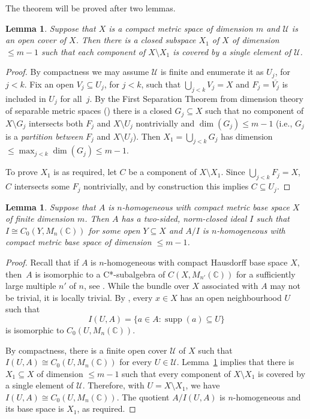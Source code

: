 \documentclass[11pt]{amsproc}
\newcommand{\cstar}{C*}
\newcommand{\bbC}{\mathbb C}
\newcommand{\cU}{\mathcal U}
\DeclareMathOperator{\supp}{supp}
\theoremstyle{definition}
\theoremstyle{plain}
\newtheorem{lemma}[definition]{Lemma}
\theoremstyle{remark}
\begin{document}
The theorem will be proved after two lemmas. 

\begin{lemma}\label{L.Dimension}
	Suppose that $X$ is a compact metric space of dimension $m$ and $\cU$ is an open cover of $X$. Then there is a closed subspace $X_1$ of $X$ of dimension $\leq m-1$ such that each component of $X\setminus X_1$ is covered by a single element of $\cU$. 
\end{lemma}

\begin{proof}
	By compactness we may assume $\cU$ is finite and enumerate it as $U_j$, for~$j<k$. Fix an open $V_j\subseteq U_j$, for $j<k$, such that $\bigcup_{j<k} V_j=X$ and $F_j=\overline {V_j}$ is included in $U_j$ for all~$j$. By the First Separation Theorem  from dimension theory of separable metric spaces (\cite[Theorem~1.5.12]{engelking1978dimension}) there is a closed $G_j\subseteq X$ such that no component of $X\setminus G_j$ intersects both  $F_j$ and $X\setminus U_j$ nontrivially and $\dim(G_j)\leq m-1$ (i.e., $G_j$ is a \emph{partition between} $F_j$ and $X\setminus U_j$). 
	Then $X_1=\bigcup_{j<k} G_j$ has dimension $\leq \max_{j<k} \dim(G_j)\leq m-1$. 
	
	To prove $X_1$ is as required, let $C$ be a component of $X\setminus X_1$. Since $\bigcup_{j<k} F_j=X$, $C$ intersects some $F_j$ nontrivially, and by construction this implies $C\subseteq U_j$.  	
\end{proof}

\begin{lemma} \label{L.DimensionInduction} Suppose that $A$ is $n$-homogeneous with compact metric base space $X$ of finite dimension $m$. Then $A$ has a two-sided, norm-closed  ideal $I$ such that $I\cong C_0(Y,M_n(\bbC))$ for some open $Y\subseteq X$ and $A/I$ is $n$-homogeneous with compact metric base space of dimension $\leq m-1$. 
\end{lemma}

\begin{proof}
	Recall that if $A$ is $n$-homogeneous with compact Hausdorff base space $X$, then~$A$ is isomorphic to a \cstar-subalgebra of $C(X,M_{n'}(\bbC))$ for a sufficiently large multiple $n'$ of $n$, see \cite[Proposition 2.9]{phillips2007recursive}. While the bundle over $X$ associated with $A$ may not be trivial, it is locally trivial. 
	By \cite[IV.1.7.23]{Black:Operator},  every 
	$x\in X$ has an open neighbourhood $U$ such that 
	\[
	I(U,A)=\{a\in A: \supp(a)\subseteq U\}
	\]
	is isomorphic to $C_0(U,M_n(\bbC))$. 
	
	By compactness, there is a finite open cover $\cU$ of $X$ such that $I(U,A)\cong C_0(U,M_n(\bbC))$ for every $U\in \cU$. 
	Lemma~\ref{L.Dimension} implies that there is $X_1\subseteq X$ of dimension $\leq m-1$ such that every component of $X\setminus X_1$ is covered by a single element of $\cU$. 
	Therefore, with $U=X\setminus X_1$, we have $I(U,A)\cong C_0(U,M_n(\bbC))$. The quotient $A/I(U,A)$ is $n$-homogeneous and its base space is $X_1$, as required. 
\end{proof}
	
\end{document}
